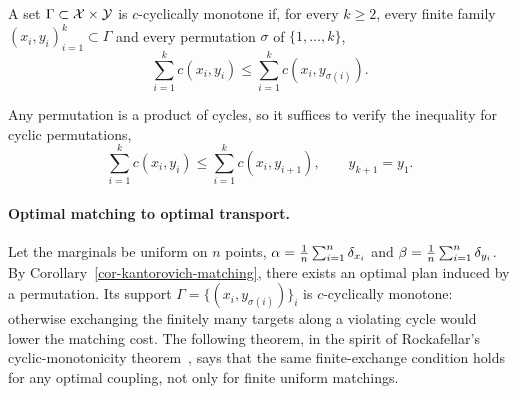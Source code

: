 \begin{defn}\label{def:ccm}
	A set $\Gamma\subset\mathcal{X}\times\mathcal{Y}$ is $c$-cyclically monotone if, for every $k\geq2$, every finite family $(x_i,y_i)_{i=1}^k\subset\Gamma$ and every permutation $\sigma$ of $\{1,\ldots,k\}$,
	\[
		\sum_{i=1}^k c(x_i,y_i)
		\leq
		\sum_{i=1}^k c(x_i,y_{\sigma(i)}).
	\]
\end{defn}

Any permutation is a product of cycles, so it suffices to verify the inequality for cyclic permutations,
\[
	\sum_{i=1}^k c(x_i,y_i)
	\leq
	\sum_{i=1}^k c(x_i,y_{i+1}),
	\qquad y_{k+1}=y_1.
\]

\paragraph{Optimal matching to optimal transport.}

Let the marginals be uniform on $n$ points, $\alpha=\frac1n\sum_{i=1}^n\delta_{x_i}$ and $\beta=\frac1n\sum_{i=1}^n\delta_{y_i}$. By Corollary~\ref{cor-kantorovich-matching}, there exists an optimal plan induced by a permutation. Its support $\Gamma=\{(x_i,y_{\sigma(i)})\}_i$ is $c$-cyclically monotone: otherwise exchanging the finitely many targets along a violating cycle would lower the matching cost. The following theorem, in the spirit of Rockafellar's cyclic-monotonicity theorem~\cite{rockafellar2015convex}, says that the same finite-exchange condition holds for any optimal coupling, not only for finite uniform matchings.

